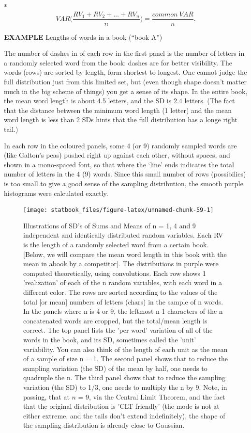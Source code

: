 \documentclass[]{book}
\begin{document}
*\[ VAR\bigg(\frac{RV_1 + RV_2 + \dots + RV_n}{n}\bigg) = \frac{common \ VAR}{n} .\]

\textbf{EXAMPLE} Lengths of words in a book (``book A'')

The number of dashes in of each row in the first panel is the number of letters in a randomly selected word from the book: dashes are for better visibility. The words (rows) are sorted by length, form shortest to longest. One cannot judge the full distribution just from this limited set, but (even though shape doesn't matter much in the big scheme of things) you get a sense of its shape. In the entire book, the mean word length is about 4.5 letters, and the SD is
2.4 letters. (The fact that the distance between the minimum word length (1 letter) and the mean word length is less than 2 SDs hints that the full distribution has a longe right tail.)

In each row in the coloured panels, some 4 (or 9) randomly sampled words are (like Galton's peas) pushed right up against each other, without spaces, and shown in a mono-spaced font, so that where the `line' ends indicates the total number of letters in the 4 (9) words. Since this small number of rows (possibilies) is too small to give a good sense of the sampling distribution, the smooth purple histograms were calculated exactly.

\begin{figure}

{\centering \texttt{[image: statbook\_files/figure-latex/unnamed-chunk-59-1]} 

}

\caption{Illustrations of SD's of Sums and Means of n = 1, 4 and 9 independent and identically distributed random variables. Each RV is the length of a randomly selected word from a certain book. [Below, we will compare the mean word length in this book with the mean in abook by a competitor]. The distributions in purple were computed theoretically, using convolutions. Each row shows 1 'realization' of each of the  n random variables, with each word in a different color. The rows are sorted according to the values of the total [or mean] numbers of letters (chars) in the sample of n words. In the panels where n is 4 or 9, the leftmost n-1 characters of the n concatenated words are cropped, but the total/mean length  is correct. The top panel lists the 'per word' variation of all of the words in the book, and its SD, sometimes called the 'unit' variability. You can also think of the length of each unit as the mean of a sample of size n = 1. The second panel shows that to reduce the sampling variation (the SD) of the mean by half, one needs to quadruple the n. The third panel shows that to reduce the sampling variation (the SD) to 1/3, one needs to multiply the n by 9. Note, in passing, that at $n$ = 9, via the Central Limit Theorem, and the fact that the original distribution is 'CLT friendly' (the mode is not at either extreme, and the tails don't extend indefinitely), the shape of the sampling distribution is already close to Gaussian.}\label{fig:unnamed-chunk-59}
\end{figure}
\end{document}
